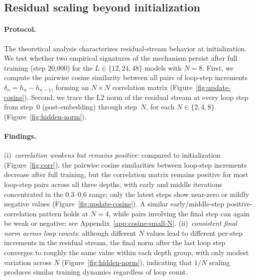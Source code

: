 \subsection{Residual scaling beyond initialization}
\label{sec:post-training}

\paragraph{Protocol.}
The theoretical analysis characterizes residual-stream behavior at initialization.
We test whether two empirical signatures of the mechanism persist after full training (step 20{,}000) for the $L\in\{12,24,48\}$ models with $N{=}8$.
First, we compute the pairwise cosine similarity between all pairs of loop-step increments $\delta_n = h_n - h_{n-1}$, forming an $N \times N$ correlation matrix (Figure~\ref{fig:update-cosine}).
Second, we trace the L2 norm of the residual stream at every loop step from step~0 (post-embedding) through step~$N$, for each $N\in\{2,4,8\}$ (Figure~\ref{fig:hidden-norm}).

\paragraph{Findings.}
(i)~\emph{correlation weakens but remains positive}: compared to initialization (Figure~\ref{fig:corr}), the pairwise cosine similarities between loop-step increments decrease after full training, but the correlation matrix remains positive for most loop-step pairs across all three depths, with early and middle iterations concentrated in the 0.3--0.6 range; only the latest steps show near-zero or mildly negative values (Figure~\ref{fig:update-cosine}). 
A similar early/middle-step positive-correlation pattern holds at $N{=}4$, while pairs involving the final step can again be weak or negative; see Appendix~\ref{app:cosine-small-N}.
(ii)~\emph{consistent final norm across loop counts}: although different $N$ values lead to different per-step increments in the residual stream, the final norm after the last loop step converges to roughly the same value within each depth group, with only modest variation across $N$ (Figure~\ref{fig:hidden-norm}), indicating that $1/N$ scaling produces similar training dynamics regardless of loop count.
